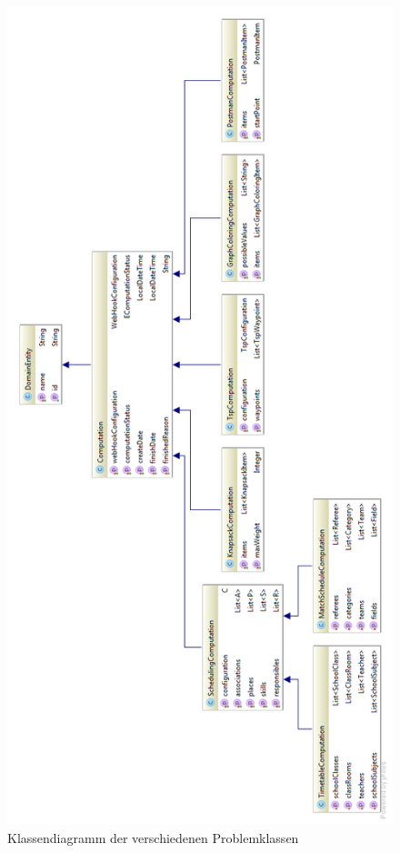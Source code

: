 \begin{figure}[h]
\centering
\includegraphics[scale=0.62]{images/computations_diagramm.png}
\caption[Klassendiagramm der verschiedenen Problemklassen]{Klassendiagramm der verschiedenen Problemklassen \selfmade{}}
\label{fig:problems_diagramm}
\end{figure}

